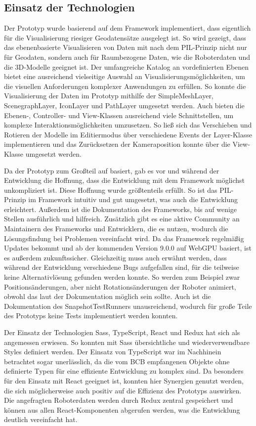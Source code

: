 \subsection{Einsatz der Technologien}
Der Prototyp wurde basierend auf dem Framework \deckgl{} implementiert, dass eigentlich für die Visualisierung riesiger Geodatensätze ausgelegt ist. So wird gezeigt, dass das ebenenbasierte Visualisieren von Daten mit \deckgl{} nach dem \ac{PIL}-Prinzip nicht nur für Geodaten, sondern auch für Raumbezogene Daten, wie die Roboterdaten und die 3D-Modelle geeignet ist. Der umfangreiche Katalog an vordefinierten Ebenen bietet eine ausreichend vielseitige Auswahl an Visualisierungsmöglichkeiten, um die visuellen Anforderungen komplexer Anwendungen zu erfüllen. So konnte die Visualisierung der Daten im Prototyp mithilfe der SimpleMeshLayer, ScenegraphLayer, IconLayer und PathLayer umgesetzt werden. Auch bieten die Ebenen-, Controller- und View-Klassen ausreichend viele Schnittstellen, um komplexe Interaktionsmöglichkeiten umzusetzen. So ließ sich das Verschieben und Rotieren der Modelle im Editiermodus über verschiedene Events der Layer-Klasse implementieren und das Zurücksetzen der Kameraposition konnte über die View-Klasse umgesetzt werden.

Da der Prototyp zum Großteil auf \deckgl{} basiert, gab es vor und während der Entwicklung die Hoffnung, dass die Entwicklung mit dem Framework möglichst unkompliziert ist. Diese Hoffnung wurde größtenteils erfüllt. So ist das \ac{PIL}-Prinzip im Framework intuitiv und gut umgesetzt, was auch die Entwicklung erleichtert. Außerdem ist die Dokumentation des Frameworks, bis auf wenige Stellen ausführlich und hilfreich. Zusätzlich gibt es eine aktive Community an Maintainern des Frameworks und Entwicklern, die es nutzen, wodurch die Lösungsfindung bei Problemen vereinfacht wird. Da das Framework regelmäßig Updates bekommt und ab der kommenden Version 9.0.0 auf WebGPU basiert, ist es außerdem zukunftssicher. Gleichzeitig muss auch erwähnt werden, dass während der Entwicklung verschiedene Bugs aufgefallen sind, für die teilweise keine Alternativlösung gefunden werden konnte. So werden zum Beispiel zwar Positionsänderungen, aber nicht Rotationsänderungen der Roboter animiert, obwohl das laut der Dokumentation möglich sein sollte. Auch ist die Dokumentation des SnapshotTestRunners unausreichend, wodurch für große Teile des Prototyps keine Tests implementiert werden konnten.

Der Einsatz der Technologien \ac{Sass}, TypeScript, React und Redux hat sich als angemessen erwiesen. So konnten mit \ac{Sass} übersichtliche und wiederverwendbare Styles definiert werden. Der Einsatz von TypeScript war im Nachhinein betrachtet sogar unerlässlich, da die vom \ac{BCB} empfangenen Objekte ohne definierte Typen für eine effiziente Entwicklung zu komplex sind. Da \deckgl{} besonders für den Einsatz mit React geeignet ist, konnten hier Synergien genutzt werden, die sich möglicherweise auch positiv auf die Effizienz des Prototyps auswirken. Die angefragten Roboterdaten werden durch Redux zentral gespeichert und können aus allen React-Komponenten abgerufen werden, was die Entwicklung deutlich vereinfacht hat.

